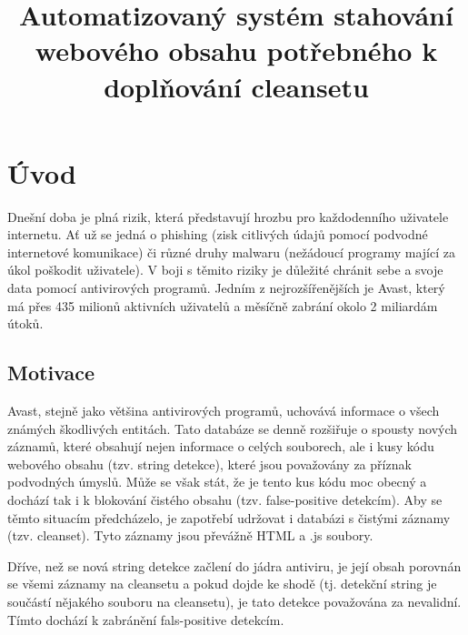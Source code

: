 \documentclass[thesis=M,czech,hidelinks]{FITthesis}[2013/05/06]
\title{Automatizovaný systém stahování webového obsahu potřebného k doplňování cleansetu}
\begin{document}





\chapter{Úvod}
Dnešní doba je plná rizik, která představují hrozbu pro každodenního uživatele internetu. Ať už se jedná o phishing (zisk citlivých údajů pomocí podvodné internetové komunikace) či různé druhy malwaru (nežádoucí programy mající za úkol poškodit uživatele). V boji s těmito riziky je důležité chránit sebe a svoje data pomocí antivirových programů. Jedním z nejrozšířenějších je Avast, který má přes 435 milionů aktivních uživatelů a měsíčně zabrání okolo 2 miliardám útoků\cite{avast_flier}.

\section{Motivace}
Avast, stejně jako většina antivirových programů, uchovává informace o všech známých škodlivých entitách. Tato databáze se denně rozšiřuje o spousty nových záznamů, které obsahují nejen informace o celých souborech, ale i kusy kódu webového obsahu (tzv. string detekce), které jsou považovány za příznak podvodných úmyslů. Může se však stát, že je tento kus kódu moc obecný a dochází tak i k blokování čistého obsahu (tzv. false-positive detekcím). Aby se těmto situacím předcházelo, je zapotřebí udržovat i databázi s čistými záznamy (tzv. cleanset). Tyto záznamy jsou převážně HTML a .js soubory.

Dříve, než se nová string detekce začlení do jádra antiviru, je její obsah porovnán se všemi záznamy na cleansetu a pokud dojde ke shodě (tj. detekční string je součástí nějakého souboru na cleansetu), je tato detekce považována za nevalidní. Tímto dochází k zabránění fals-positive detekcím. 
\end{document}
